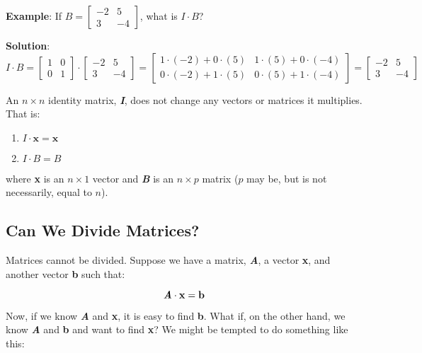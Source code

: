 \textbf{Example}: If $\mathbf{\mathit{B}} = \begin{bmatrix}
-2 & 5\\
3 & -4
\end{bmatrix}$, what is $\mathbf{\mathit{I}} \cdot \mathbf{\mathit{B}}$?

\textbf{Solution}: $$\mathbf{\mathit{I}} \cdot \mathbf{\mathit{B}} =
\begin{bmatrix}
1 & 0 \\
0 & 1
\end{bmatrix} \cdot \begin{bmatrix}
-2 & 5\\
3 & -4
\end{bmatrix} = \begin{bmatrix}
1 \cdot (-2) + 0 \cdot (5) & 1 \cdot (5) + 0 \cdot (-4)\\
0 \cdot (-2) + 1 \cdot (5) & 0 \cdot (5) + 1 \cdot (-4)
\end{bmatrix} = \begin{bmatrix}
-2 & 5\\
3 & -4
\end{bmatrix}$$

\begin{mdframed}[style = important, frametitle = {Properties of the Identity Matrix}]
An $n \times n$ identity matrix, \textbf{\textit{I}}, does not change any
vectors or matrices it multiplies. That is:
\begin{enumerate}
\item $\mathbf{\mathit{I}} \cdot \mathbf{x} = \mathbf{x}$
\item $\mathbf{\mathit{I}} \cdot \mathbf{\mathit{B}} = \mathbf{\mathit{B}}$
\end{enumerate}
where \textbf{x} is an $n \times 1$ vector and \textbf{\textit{B}} is an $n
\times p$ matrix ($p$ may be, but is not necessarily, equal to $n$).
\end{mdframed}

\subsection{Can We Divide Matrices?}
Matrices cannot be divided. Suppose we have a matrix, \textbf{\textit{A}}, a vector \textbf{x}, and another vector \textbf{b} such that:

$$\textbf{\textit{A}} \cdot \textbf{x} = \textbf{b}$$

Now, if we know \textbf{\textit{A}} and \textbf{x}, it is easy to find \textbf{b}. What if, on the other hand, we know \textbf{\textit{A}} and \textbf{b} and want to find \textbf{x}? We might be tempted to do something like this:

